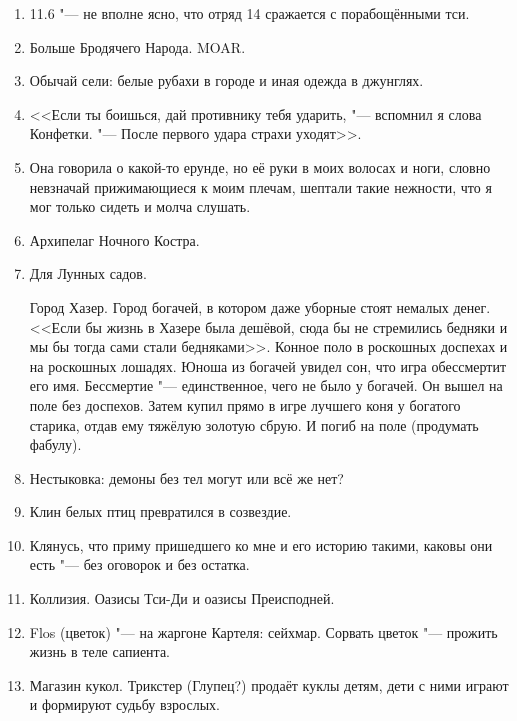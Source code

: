 \documentclass[a4paper,10pt,fleqn]{book}
\begin{document}
\begin{enumerate}
\item 11.6 "--- не вполне ясно, что отряд 14 сражается с порабощёнными тси.

\item Больше Бродячего Народа.
MOAR.

\item Обычай сели: белые рубахи в городе и иная одежда в джунглях.

\item <<Если ты боишься, дай противнику тебя ударить, "--- вспомнил я слова Конфетки.
"--- После первого удара страхи уходят>>.

\item Она говорила о какой-то ерунде, но её руки в моих волосах и ноги, словно невзначай прижимающиеся к моим плечам, шептали такие нежности, что я мог только сидеть и молча слушать.

\item Архипелаг Ночного Костра.

\item Для Лунных садов.

Город Хазер.
Город богачей, в котором даже уборные стоят немалых денег.
<<Если бы жизнь в Хазере была дешёвой, сюда бы не стремились бедняки и мы бы тогда сами стали бедняками>>.
Конное поло в роскошных доспехах и на роскошных лошадях.
Юноша из богачей увидел сон, что игра обессмертит его имя.
Бессмертие "--- единственное, чего не было у богачей.
Он вышел на поле без доспехов.
Затем купил прямо в игре лучшего коня у богатого старика, отдав ему тяжёлую золотую сбрую.
И погиб на поле (продумать фабулу).

\item Нестыковка: демоны без тел могут или всё же нет?

\item Клин белых птиц превратился в созвездие.

\item Клянусь, что приму пришедшего ко мне и его историю такими, каковы они есть "--- без оговорок и без остатка.

\item Коллизия. Оазисы Тси-Ди и оазисы Преисподней.

\item Flos (цветок) "--- на жаргоне Картеля: сейхмар.
Сорвать цветок "--- прожить жизнь в теле сапиента.

\item Магазин кукол.
Трикстер (Глупец?) продаёт куклы детям, дети с ними играют и формируют судьбу взрослых.


\end{enumerate}
\end{document}
